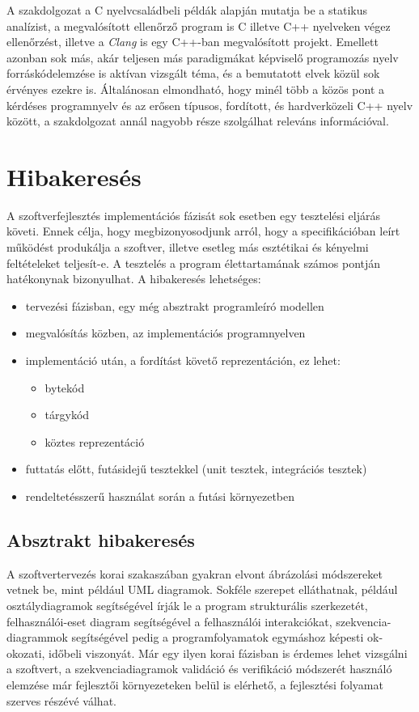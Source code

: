 \documentclass[a4paper,12pt]{report}
\begin{document}
A szakdolgozat a C nyelvcsaládbeli példák alapján mutatja be a statikus analízist, a megvalósított ellenőrző program is C illetve C++ nyelveken végez ellenőrzést, illetve a \emph{Clang} is egy C++-ban megvalósított projekt. Emellett azonban sok más, akár teljesen más paradigmákat képviselő programozás nyelv forráskódelemzése is aktívan vizsgált téma, és a bemutatott elvek közül sok érvényes ezekre is. Általánosan elmondható, hogy minél több a közös pont a kérdéses programnyelv és az erősen típusos, fordított, és hardverközeli C++ nyelv között, a szakdolgozat annál nagyobb része szolgálhat releváns információval.

\section{Hibakeresés}
A szoftverfejlesztés implementációs fázisát sok esetben egy tesztelési eljárás követi. Ennek célja, hogy megbizonyosodjunk arról, hogy a specifikációban leírt működést produkálja a szoftver, illetve esetleg más esztétikai és kényelmi feltételeket teljesít-e.
A tesztelés a program élettartamának számos pontján hatékonynak bizonyulhat. A hibakeresés lehetséges:
\begin{itemize}
\item tervezési fázisban, egy még absztrakt programleíró modellen
\item megvalósítás közben, az implementációs programnyelven
\item implementáció után, a fordítást követő reprezentáción, ez lehet:
\begin{itemize}
\item bytekód
\item tárgykód
\item köztes reprezentáció
\end{itemize}
\item futtatás előtt, futásidejű tesztekkel (unit tesztek, integrációs tesztek)
\item rendeltetésszerű használat során a futási környezetben \cite{chaosmonkey}
\end{itemize}

\subsection{Absztrakt hibakeresés}
A szoftvertervezés korai szakaszában gyakran elvont ábrázolási módszereket vetnek be, mint például UML diagramok. Sokféle szerepet elláthatnak, például osztálydiagramok segítségével írják le a program strukturális szerkezetét, felhasználói-eset diagram segítségével a felhasználói interakciókat, szekvencia-diagrammok segítségével pedig a programfolyamatok egymáshoz képesti ok-okozati, időbeli viszonyát. Már egy ilyen korai fázisban is érdemes lehet vizsgálni a szoftvert, a szekvenciadiagramok validáció és verifikáció módszerét használó elemzése  \cite{umlverification} már fejlesztői környezeteken belül is elérhető, a fejlesztési folyamat szerves részévé válhat.
\end{document}
